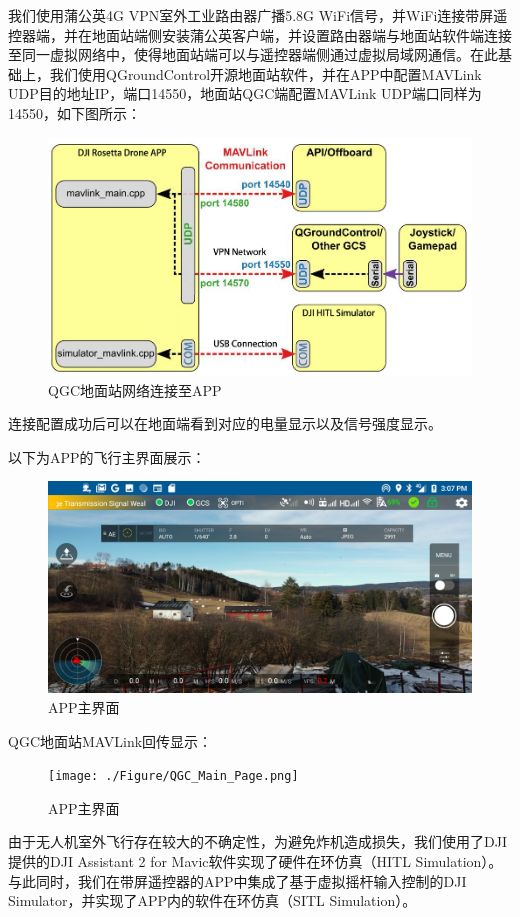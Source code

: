 我们使用蒲公英4G VPN室外工业路由器广播5.8G WiFi信号，并WiFi连接带屏遥控器端，并在地面站端侧安装蒲公英客户端，并设置路由器端与地面站软件端连接至同一虚拟网络中，使得地面站端可以与遥控器端侧通过虚拟局域网通信。在此基础上，我们使用QGroundControl开源地面站软件，并在APP中配置MAVLink UDP目的地址IP，端口14550，地面站QGC端配置MAVLink UDP端口同样为14550，如下图所示：

\begin{figure}[ht]
  \centering
  \includegraphics[width=0.8\linewidth]{./Figure/QGC_Connect_to_APP.png}
  \caption{QGC地面站网络连接至APP}\label{Fig:img13}
\end{figure}

连接配置成功后可以在地面端看到对应的电量显示以及信号强度显示。

以下为APP的飞行主界面展示：

\begin{figure}[ht]
  \centering
  \includegraphics[width=0.8\linewidth]{./Figure/APP_Main_Page.png}
  \caption{APP主界面}\label{Fig:img14}
\end{figure}

QGC地面站MAVLink回传显示：

\begin{figure}[ht]
  \centering
  \texttt{[image: ./Figure/QGC\_Main\_Page.png]}
  \caption{APP主界面}\label{Fig:img15}
\end{figure}

由于无人机室外飞行存在较大的不确定性，为避免炸机造成损失，我们使用了DJI提供的DJI Assistant 2 for Mavic软件实现了硬件在环仿真（HITL Simulation）。与此同时，我们在带屏遥控器的APP中集成了基于虚拟摇杆输入控制的DJI Simulator，并实现了APP内的软件在环仿真（SITL Simulation）。

